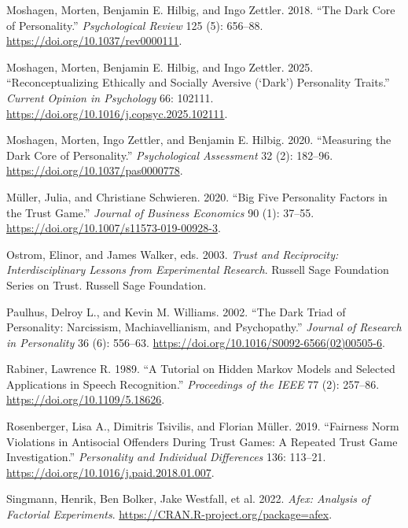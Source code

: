 \documentclass[
]{article}
\newlength{\cslhangindent}
\newenvironment{CSLReferences}[2] %
 {\begin{list}{}{%
  \setlength{\itemindent}{0pt}
  \setlength{\leftmargin}{0pt}
  \setlength{\parsep}{0pt}
  \ifodd #1
   \setlength{\leftmargin}{\cslhangindent}
   \setlength{\itemindent}{-1\cslhangindent}
  \fi
  \setlength{\itemsep}{#2\baselineskip}}}
 {\end{list}}
\begin{document}
\begin{CSLReferences}{1}{1}
Moshagen, Morten, Benjamin E. Hilbig, and Ingo Zettler. 2018. {``The Dark Core of Personality.''} \emph{Psychological Review} 125 (5): 656--88. \url{https://doi.org/10.1037/rev0000111}.

Moshagen, Morten, Benjamin E. Hilbig, and Ingo Zettler. 2025. {``Reconceptualizing Ethically and Socially Aversive ({`Dark'}) Personality Traits.''} \emph{Current Opinion in Psychology} 66: 102111. \url{https://doi.org/10.1016/j.copsyc.2025.102111}.

Moshagen, Morten, Ingo Zettler, and Benjamin E. Hilbig. 2020. {``Measuring the Dark Core of Personality.''} \emph{Psychological Assessment} 32 (2): 182--96. \url{https://doi.org/10.1037/pas0000778}.

Müller, Julia, and Christiane Schwieren. 2020. {``Big Five Personality Factors in the Trust Game.''} \emph{Journal of Business Economics} 90 (1): 37--55. \url{https://doi.org/10.1007/s11573-019-00928-3}.

Ostrom, Elinor, and James Walker, eds. 2003. \emph{Trust and Reciprocity: Interdisciplinary Lessons from Experimental Research}. Russell Sage Foundation Series on Trust. Russell Sage Foundation.

Paulhus, Delroy L., and Kevin M. Williams. 2002. {``The Dark Triad of Personality: Narcissism, Machiavellianism, and Psychopathy.''} \emph{Journal of Research in Personality} 36 (6): 556--63. \url{https://doi.org/10.1016/S0092-6566(02)00505-6}.

Rabiner, Lawrence R. 1989. {``A Tutorial on Hidden Markov Models and Selected Applications in Speech Recognition.''} \emph{Proceedings of the IEEE} 77 (2): 257--86. \url{https://doi.org/10.1109/5.18626}.

Rosenberger, Lisa A., Dimitris Tsivilis, and Florian Müller. 2019. {``Fairness Norm Violations in Antisocial Offenders During Trust Games: {A} Repeated Trust Game Investigation.''} \emph{Personality and Individual Differences} 136: 113--21. \url{https://doi.org/10.1016/j.paid.2018.01.007}.

{Singmann, Henrik, Ben Bolker, Jake Westfall, et al.} 2022. \emph{Afex: Analysis of Factorial Experiments}. \url{https://CRAN.R-project.org/package=afex}.


\end{CSLReferences}
\end{document}
